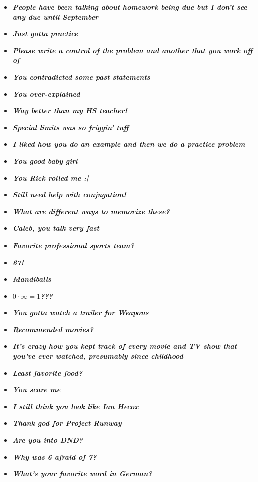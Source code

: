 \documentclass[11pt,letterpaper]{article}
\begin{document}
\begin{itemize}
\item {\bfseries\itshape People have been talking about homework being due but I don't see any due until September} 
\item {\bfseries\itshape Just gotta practice} 
\item {\bfseries\itshape Please write a control of the problem and another that you work off of}
\item {\bfseries\itshape You contradicted some past statements}
\item {\bfseries\itshape You over-explained}
\item {\bfseries\itshape Way better than my HS teacher!}
\item {\bfseries\itshape Special limits was so friggin' tuff}
\item {\bfseries\itshape I liked how you do an example and then we do a practice problem}
\item {\bfseries\itshape You good baby girl}
\item {\bfseries\itshape You Rick rolled me :| }
\item {\bfseries\itshape Still need help with conjugation!}
\item {\bfseries\itshape What are different ways to memorize these?}
\item {\bfseries\itshape Caleb, you talk very fast}
\item {\bfseries\itshape Favorite professional sports team?}
\item {\bfseries\itshape 67!}
\item {\bfseries\itshape Mandiballs}
\item {\bfseries\itshape $0 \cdot \infty= 1$???}
\item {\bfseries\itshape You gotta watch a trailer for Weapons}
\item {\bfseries\itshape Recommended movies?}
\item {\bfseries\itshape It's crazy how you kept track of every movie and TV show that you've ever watched, presumably since childhood}
\item {\bfseries\itshape Least favorite food?}
\item {\bfseries\itshape You scare me}
\item {\bfseries\itshape I still think you look like Ian Hecox} 
\item {\bfseries\itshape Thank god for Project Runway} 
\item {\bfseries\itshape Are you into DND?}
\item {\bfseries\itshape Why was 6 afraid of 7?}
\item {\bfseries\itshape What's your favorite word in German?}
\end{itemize}
\end{document}
